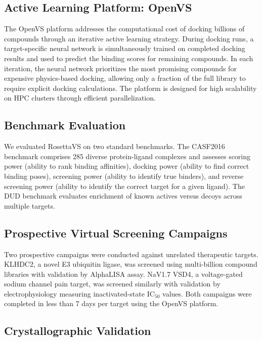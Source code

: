 \documentclass[12pt]{article}
\begin{document}
\subsection{Active Learning Platform: OpenVS}

The OpenVS platform addresses the computational cost of docking billions of compounds through an iterative active learning strategy. During docking runs, a target-specific neural network is simultaneously trained on completed docking results and used to predict the binding scores for remaining compounds. In each iteration, the neural network prioritizes the most promising compounds for expensive physics-based docking, allowing only a fraction of the full library to require explicit docking calculations. The platform is designed for high scalability on HPC clusters through efficient parallelization.

\subsection{Benchmark Evaluation}

We evaluated RosettaVS on two standard benchmarks. The CASF2016 benchmark \citep{su2019} comprises 285 diverse protein-ligand complexes and assesses scoring power (ability to rank binding affinities), docking power (ability to find correct binding poses), screening power (ability to identify true binders), and reverse screening power (ability to identify the correct target for a given ligand). The DUD benchmark \citep{huang2006} evaluates enrichment of known actives versus decoys across multiple targets.

\subsection{Prospective Virtual Screening Campaigns}

Two prospective campaigns were conducted against unrelated therapeutic targets. KLHDC2, a novel E3 ubiquitin ligase, was screened using multi-billion compound libraries with validation by AlphaLISA assay. NaV1.7 VSD4, a voltage-gated sodium channel pain target, was screened similarly with validation by electrophysiology measuring inactivated-state IC$_{50}$ values. Both campaigns were completed in less than 7 days per target using the OpenVS platform.

\subsection{Crystallographic Validation}
\end{document}
